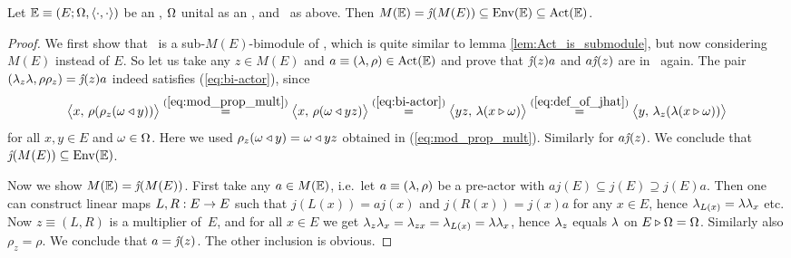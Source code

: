 \begin{prop_sec}  \label{prop:ME=MEE}
  Let\/ $\mathbb{E} \equiv (E; \Omega, \langle\cdot, \cdot\rangle)$ be an \context,
  $\Omega$ unital as an \Ebimod, and \jhat\ as above.
  Then $M(\EE) = \jhat(M(E)) \subseteq \EnvE \subseteq \ActE$.
\end{prop_sec}
\begin{proof}
   We first show that \ActE\ is a sub-$M(E)$-bimodule of \PreE, which is quite similar
    to lemma \ref{lem:Act_is_submodule}, but now considering $M(E)$ instead of $E$\@.
   So let us take any $z\in M(E)$ and $a\equiv (\lambda,\rho) \in \mbox{\rm Act}(\mathbb{E})$
   and prove that $\jhat(z)a$ and $a\jhat(z)$ are in \ActE\ again.
   The pair $(\lam_z\lam,\rho\rho_z)=\jhat(z)a$ indeed satisfies (\ref{eq:bi-actor}), since
   $$   \pairM{x}{\rho(\rho_z(\om \ract y))}
          \stackrel{(\ref{eq:mod_prop_mult})}{=}
                    \pairM{x}{\rho(\om\ract yz)}
          \stackrel{(\ref{eq:bi-actor})}{=}
                    \pairM{yz}{\lam(x\lact\om)}
          \stackrel{(\ref{eq:def_of_jhat})}{=}
                    \pairM{y}{\lam_z(\lam(x\lact\om))}      $$
  for all $x,y \in E$ and $\omega \in \Omega$.
  Here we used $\rho_z(\omega \triangleleft y) = \omega \triangleleft yz$ obtained in (\ref{eq:mod_prop_mult}).
  Similarly for $a\jhat(z)$.  We conclude that $\jhat(M(E)) \subseteq \EnvE$.

  Now we show $M(\EE) = \jhat(M(E))$\@. First take any $a \in M(\mathbb{E})$,
  i.e.\ let $a\equiv (\lambda,\rho)$ be a pre-actor with $a j(E) \subseteq j(E) \supseteq j(E)a$.
  Then one can construct linear maps $L,R: E \rightarrow E$ such that
  $j(L(x))= a j(x)$ and $j(R(x))=j(x)a$ for any $x\in E$,
  hence $\lambda_{L(x)}=\lambda \lambda_x$ etc.
  Now $z\equiv (L,R)$ is a multiplier \mbox{of $E$}, and
  for all $x\in E$ we get $\lambda_z\lambda_x = \lambda_{zx} = \lambda_{L(x)} = \lambda\lambda_x$,
  hence $\lambda_z$ equals $\lambda$ on $E \triangleright \Omega = \Omega$. Similarly also $\rho_z =\rho$.
  We conclude that $a = \jhat(z)$.
  The other inclusion is obvious.
\end{proof}



